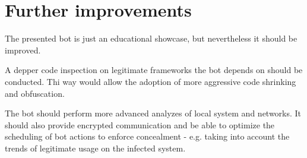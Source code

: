 \section{Further improvements}
\label{sec:further-improvements}

The presented bot is just an educational showcase, but nevertheless it should be improved.

A depper code inspection on legitimate frameworks the bot depends on should be conducted. Thi way would allow the adoption of more aggressive code shrinking and obfuscation.

The bot should perform more advanced analyzes of local system and networks. It should also provide encrypted communication and be able to optimize the scheduling of bot actions to enforce concealment - e.g. taking into account the trends of legitimate usage on the infected system.
